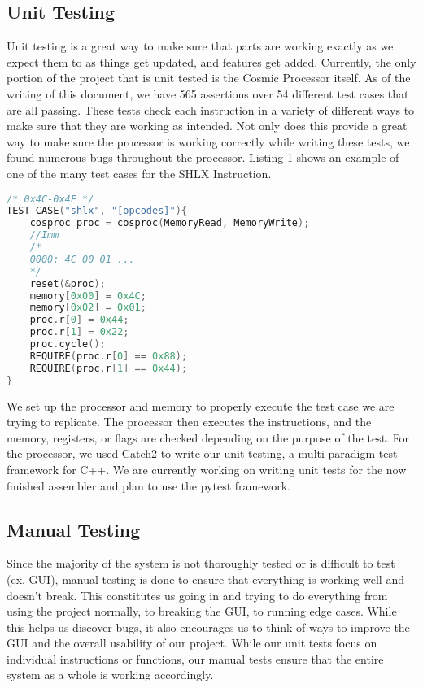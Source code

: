 \documentclass[conference]{IEEEtran}
\begin{document}
\subsection{Unit Testing}
Unit testing is a great way to make sure that parts are working exactly as we expect them to as things get updated, and features get added. Currently, the only portion of the project that is unit tested is the Cosmic Processor itself. As of the writing of this document, we have 565 assertions over 54 different test cases that are all passing. These tests check each instruction in a variety of different ways to make sure that they are working as intended. Not only does this provide a great way to make sure the processor is working correctly while writing these tests, we found numerous bugs throughout the processor. Listing 1 shows an example of one of the many test cases for the SHLX Instruction. 
\begin{lstlisting}[language=C++, caption=A Unit Test for the SHLX Instruction]
/* 0x4C-0x4F */
TEST_CASE("shlx", "[opcodes]"){
    cosproc proc = cosproc(MemoryRead, MemoryWrite);
    //Imm
    /*
    0000: 4C 00 01 ...
    */
    reset(&proc);
    memory[0x00] = 0x4C;
    memory[0x02] = 0x01;
    proc.r[0] = 0x44;
    proc.r[1] = 0x22;
    proc.cycle();
    REQUIRE(proc.r[0] == 0x88);
    REQUIRE(proc.r[1] == 0x44);
}
\end{lstlisting}
We set up the processor and memory to properly execute the test case we are trying to replicate. The processor then executes the instructions, and the memory, registers, or flags are checked depending on the purpose of the test. For the processor, we used Catch2 to write our unit testing, a multi-paradigm test framework for C++. We are currently working on writing unit tests for the now finished assembler and plan to use the pytest framework.

\subsection{Manual Testing}
Since the majority of the system is not thoroughly tested or is difficult to test (ex. GUI), manual testing is done to ensure that everything is working well and doesn't break. This constitutes us going in and trying to do everything from using the project normally, to breaking the GUI, to running edge cases. While this helps us discover bugs, it also encourages us to think of ways to improve the GUI and the overall usability of our project. While our unit tests focus on individual instructions or functions, our manual tests ensure that the entire system as a whole is working accordingly.
\end{document}
